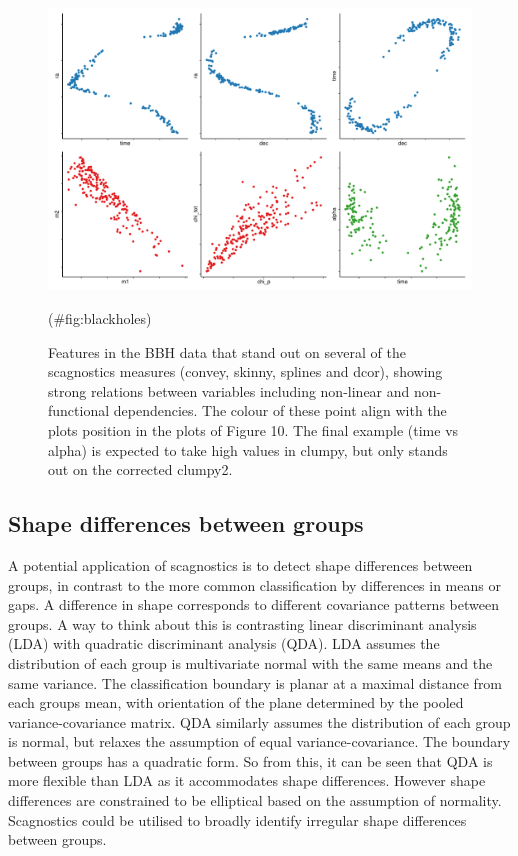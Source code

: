 \begin{Schunk}
\begin{figure}
\includegraphics[width=1\linewidth]{mason-lee-laa-cook_files/figure-latex/blackholes-1} \caption[Features in the BBH data that stand out on several of the scagnostics measures (convey, skinny, splines and dcor), showing strong relations between variables including non-linear and non-functional dependencies]{Features in the BBH data that stand out on several of the scagnostics measures (convey, skinny, splines and dcor), showing strong relations between variables including non-linear and non-functional dependencies. The colour of these point align with the plots position in the plots of Figure 10. The final example (time vs alpha) is expected to take high values in clumpy, but only stands out on the corrected clumpy2.}(\#fig:blackholes)
\end{figure}
\end{Schunk}

\hypertarget{shape-differences-between-groups}{%
\subsection{Shape differences between
groups}\label{shape-differences-between-groups}}

A potential application of scagnostics is to detect shape differences
between groups, in contrast to the more common classification by
differences in means or gaps. A difference in shape corresponds to
different covariance patterns between groups. A way to think about this
is contrasting linear discriminant analysis (LDA) with quadratic
discriminant analysis (QDA). LDA assumes the distribution of each group
is multivariate normal with the same means and the same variance. The
classification boundary is planar at a maximal distance from each groups
mean, with orientation of the plane determined by the pooled
variance-covariance matrix. QDA similarly assumes the distribution of
each group is normal, but relaxes the assumption of equal
variance-covariance. The boundary between groups has a quadratic form.
So from this, it can be seen that QDA is more flexible than LDA as it
accommodates shape differences. However shape differences are
constrained to be elliptical based on the assumption of normality.
Scagnostics could be utilised to broadly identify irregular shape
differences between groups.

